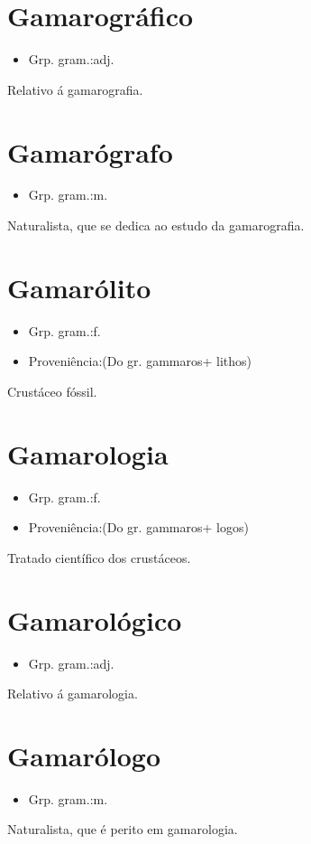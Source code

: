 \section{Gamarográfico}
\begin{itemize}
\item {Grp. gram.:adj.}
\end{itemize}
Relativo á gamarografia.
\section{Gamarógrafo}
\begin{itemize}
\item {Grp. gram.:m.}
\end{itemize}
Naturalista, que se dedica ao estudo da gamarografia.
\section{Gamarólito}
\begin{itemize}
\item {Grp. gram.:f.}
\end{itemize}
\begin{itemize}
\item {Proveniência:(Do gr. \textunderscore gammaros\textunderscore  + \textunderscore lithos\textunderscore )}
\end{itemize}
Crustáceo fóssil.
\section{Gamarologia}
\begin{itemize}
\item {Grp. gram.:f.}
\end{itemize}
\begin{itemize}
\item {Proveniência:(Do gr. \textunderscore gammaros\textunderscore  + \textunderscore logos\textunderscore )}
\end{itemize}
Tratado científico dos crustáceos.
\section{Gamarológico}
\begin{itemize}
\item {Grp. gram.:adj.}
\end{itemize}
Relativo á gamarologia.
\section{Gamarólogo}
\begin{itemize}
\item {Grp. gram.:m.}
\end{itemize}
Naturalista, que é perito em gamarologia.
